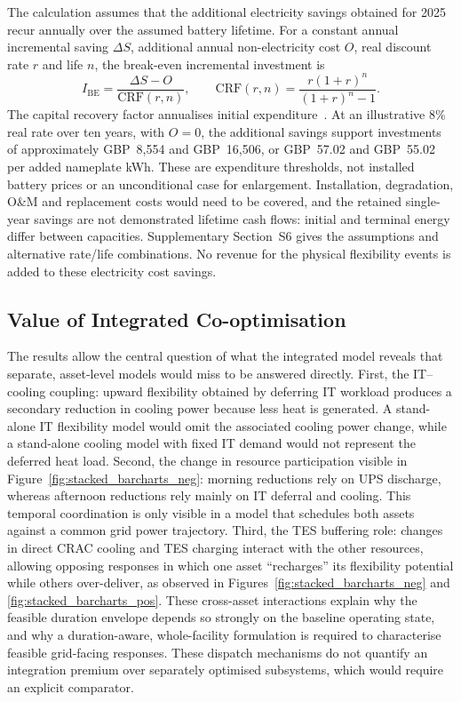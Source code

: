 \documentclass[lettersize,journal]{IEEEtran}
\newcommand{\rev}[1]{#1}
\begin{document}
The calculation assumes that the additional electricity savings obtained for 2025 recur annually over the assumed battery lifetime. For a constant annual incremental saving $\Delta S$, additional annual non-electricity cost $O$, real discount rate $r$ and life $n$, the break-even incremental investment is
\begin{equation}
I_{\mathrm{BE}}=\frac{\Delta S-O}{\mathrm{CRF}(r,n)},\qquad
\mathrm{CRF}(r,n)=\frac{r(1+r)^n}{(1+r)^n-1}.
\label{eq:ups-investment}
\end{equation}
The capital recovery factor annualises initial expenditure~\cite{sam_crf}. At an illustrative 8\% real rate over ten years, with $O=0$, the additional savings support investments of approximately GBP~8,554 and GBP~16,506, or GBP~57.02 and GBP~55.02 per added nameplate kWh. These are expenditure thresholds, not installed battery prices or an unconditional case for enlargement. Installation, degradation, O\&M and replacement costs would need to be covered, and the retained single-year savings are not demonstrated lifetime cash flows: initial and terminal energy differ between capacities. Supplementary Section~S6 gives the assumptions and alternative rate/life combinations. No revenue for the physical flexibility events is added to these electricity cost savings.


\subsection{\rev{Value of Integrated Co-optimisation}}\label{sec:integration-value}
\rev{The results allow the central question of what the integrated model reveals that separate, asset-level models would miss to be answered directly. First, the IT--cooling coupling: upward flexibility obtained by deferring IT workload produces a secondary reduction in cooling power because less heat is generated. A stand-alone IT flexibility model would omit the associated cooling power change, while a stand-alone cooling model with fixed IT demand would not represent the deferred heat load. Second, the change in resource participation visible in Figure~\ref{fig:stacked_barcharts_neg}: morning reductions rely on UPS discharge, whereas afternoon reductions rely mainly on IT deferral and cooling. This temporal coordination is only visible in a model that schedules both assets against a common grid power trajectory. Third, the TES buffering role: changes in direct CRAC cooling and TES charging interact with the other resources, allowing opposing responses in which one asset ``recharges'' its flexibility potential while others over-deliver, as observed in Figures~\ref{fig:stacked_barcharts_neg} and \ref{fig:stacked_barcharts_pos}. These cross-asset interactions explain why the feasible duration envelope depends so strongly on the baseline operating state, and why a duration-aware, whole-facility formulation is required to characterise feasible grid-facing responses. These dispatch mechanisms do not quantify an integration premium over separately optimised subsystems, which would require an explicit comparator.}
\end{document}
